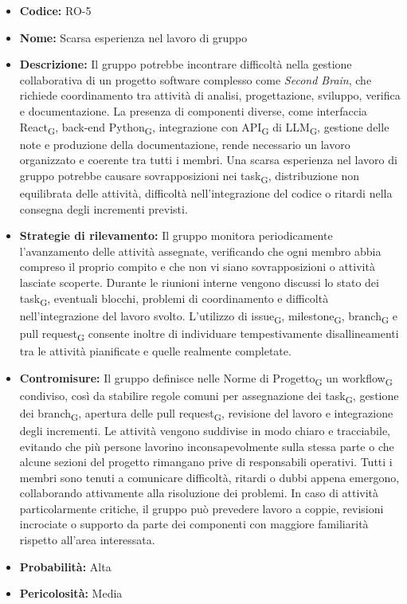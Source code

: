 \documentclass[a4paper, 10pt, colorlinks=true, linkcolor=black, urlcolor=blue, citecolor=blue, hidelinks]{article}
\begin{document}
\begin{itemize}
    \item \textbf{Codice:} RO-5

    \item \textbf{Nome:} Scarsa esperienza nel lavoro di gruppo

    \item \textbf{Descrizione:} Il gruppo potrebbe incontrare difficoltà nella gestione collaborativa di un progetto software complesso come \textit{Second Brain}, che richiede coordinamento tra attività di analisi, progettazione, sviluppo, verifica e documentazione. La presenza di componenti diverse, come interfaccia React\textsubscript{G}, back-end Python\textsubscript{G}, integrazione con API\textsubscript{G} di LLM\textsubscript{G}, gestione delle note e produzione della documentazione, rende necessario un lavoro organizzato e coerente tra tutti i membri. Una scarsa esperienza nel lavoro di gruppo potrebbe causare sovrapposizioni nei task\textsubscript{G}, distribuzione non equilibrata delle attività, difficoltà nell'integrazione del codice o ritardi nella consegna degli incrementi previsti.

    \item \textbf{Strategie di rilevamento:} Il gruppo monitora periodicamente l'avanzamento delle attività assegnate, verificando che ogni membro abbia compreso il proprio compito e che non vi siano sovrapposizioni o attività lasciate scoperte. Durante le riunioni interne vengono discussi lo stato dei task\textsubscript{G}, eventuali blocchi, problemi di coordinamento e difficoltà nell'integrazione del lavoro svolto. L'utilizzo di issue\textsubscript{G}, milestone\textsubscript{G}, branch\textsubscript{G} e pull request\textsubscript{G} consente inoltre di individuare tempestivamente disallineamenti tra le attività pianificate e quelle realmente completate.

    \item \textbf{Contromisure:} Il gruppo definisce nelle Norme di Progetto\textsubscript{G} un workflow\textsubscript{G} condiviso, così da stabilire regole comuni per assegnazione dei task\textsubscript{G}, gestione dei branch\textsubscript{G}, apertura delle pull request\textsubscript{G}, revisione del lavoro e integrazione degli incrementi. Le attività vengono suddivise in modo chiaro e tracciabile, evitando che più persone lavorino inconsapevolmente sulla stessa parte o che alcune sezioni del progetto rimangano prive di responsabili operativi. Tutti i membri sono tenuti a comunicare difficoltà, ritardi o dubbi appena emergono, collaborando attivamente alla risoluzione dei problemi. In caso di attività particolarmente critiche, il gruppo può prevedere lavoro a coppie, revisioni incrociate o supporto da parte dei componenti con maggiore familiarità rispetto all'area interessata.

    \item \textbf{Probabilità:} Alta

    \item \textbf{Pericolosità:} Media
\end{itemize}
\end{document}
